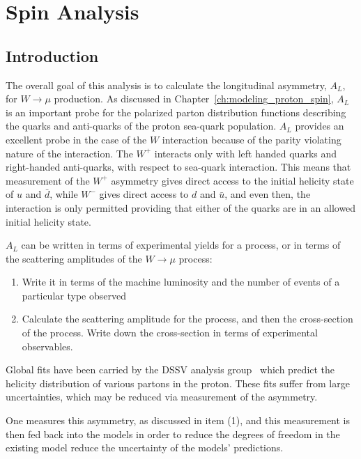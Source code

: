 \chapter{Spin Analysis}
\label{ch:spin_analysis}
\section{Introduction}

The overall goal of this analysis is to calculate the longitudinal asymmetry,
$A_L$, for $W\rightarrow\mu$ production. As discussed in
Chapter~\ref{ch:modeling_proton_spin}, $A_L$ is an important probe for the
polarized parton distribution functions describing the quarks and anti-quarks of
the proton sea-quark population. $A_L$ provides an excellent probe in the case
of the $W$ interaction because of the parity violating nature of the
interaction. The $W^+$ interacts only with left handed quarks and right-handed
anti-quarks, with respect to sea-quark interaction. This means that measurement
of the $W^+$ asymmetry gives direct access to the initial helicity state of $u$
and $\bar{d}$, while $W^-$ gives direct access to $d$ and $\bar{u}$, and even
then, the interaction is only permitted providing that either of the quarks are
in an allowed initial helicity state.

{\noindent}$A_L$ can be written in terms of experimental yields for a process,
or in terms of the scattering amplitudes of the $W\rightarrow\mu$ process:

\begin{enumerate}
  \item Write it in terms of the machine luminosity and the number of events of
    a particular type observed
  \item Calculate the scattering amplitude for the process, and then the
    cross-section of the process. Write down the cross-section in terms of
    experimental observables.
\end{enumerate}

Global fits have been carried by the DSSV analysis group~\cite{DeFlorian2009}
which predict the helicity distribution of various partons in the proton. These
fits suffer from large uncertainties, which may be reduced via measurement of
the asymmetry.

One measures this asymmetry, as discussed in item (1), and this measurement is
then fed back into the models in order to reduce the degrees of freedom in the
existing model reduce the uncertainty of the models' predictions. 

